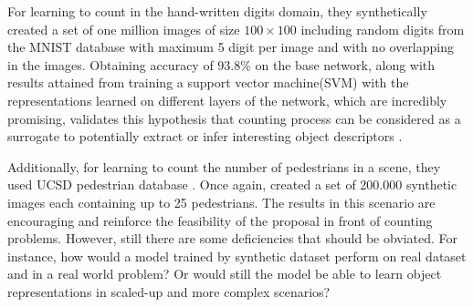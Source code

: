 For learning to count in the hand-written digits domain, they synthetically created a set of one million images of size $100\times100$ including random digits from the MNIST database with maximum 5 digit per image and with no overlapping in the images. Obtaining accuracy of 93.8\% on the base network, along with results attained from training a support vector machine(SVM) with the representations learned on different layers of the network, which are incredibly promising, validates this hypothesis that counting process can be considered as a surrogate to potentially extract or infer interesting object descriptors \cite{segui2015learning}. 

Additionally, for learning to count the number of pedestrians in a scene, they used UCSD pedestrian database \cite{chan2008privacy}. Once again, \citealt*{segui2015learning} created a set of 200.000 synthetic images each containing up to 25 pedestrians. The results in this scenario are encouraging and reinforce the feasibility of the proposal in front of counting problems. However, still there are some deficiencies that should be obviated. For instance, how would a model trained by synthetic dataset perform on real dataset and in a real world problem? Or would still the model be able to learn object representations in scaled-up and more complex scenarios?





